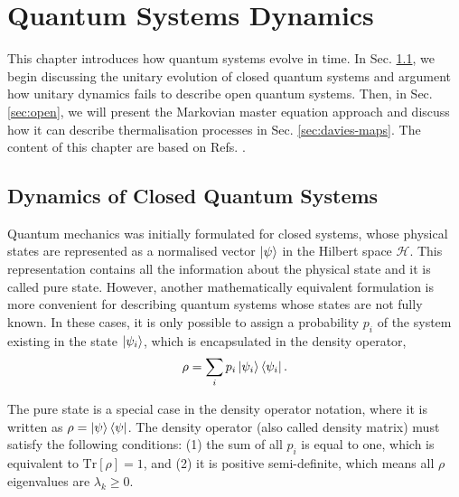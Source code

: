 

\chapter{Quantum Systems Dynamics}\label{cap:oqs}

This chapter introduces how quantum systems evolve in time. In Sec. \ref{sec:close}, we begin discussing the unitary evolution of closed quantum systems and argument how unitary dynamics fails to describe open quantum systems. Then, in Sec. \ref{sec:open}, we will present the Markovian master equation approach and discuss how it can describe thermalisation processes in Sec. \ref{sec:davies-maps}. The content of this chapter are based on Refs. \cite{petruccione-book, scully-book, plenio-2010}.



\section{Dynamics of Closed Quantum Systems} \label{sec:close}

Quantum mechanics was initially formulated for closed systems, whose physical states are represented as a normalised vector $\ket{\psi}$ in the Hilbert space $\mathcal{H}$. This representation contains all the information about the physical state and it is called pure state. However, another mathematically equivalent formulation is more convenient for describing quantum systems whose states are not fully known. In these cases, it is only possible to assign a probability $p_i$ of the system existing in the state $\ket{\psi_i}$, which is encapsulated in the density operator,
\begin{equation}
    {\rho} = \sum_i p_i \ket{\psi_i} \bra{\psi_i}.
\end{equation}

\noindent The pure state is a special case in the density operator notation, where it is written as ${\rho} = \ket{\psi}\bra{\psi}$. The density operator (also called density matrix) must satisfy the following conditions: (1) the sum of all $p_i$ is equal to one, which is equivalent to $\text{Tr}[{\rho}] = 1$, and (2) it is positive semi-definite, which means all ${\rho}$ eigenvalues are $\lambda_k \geq 0$.

